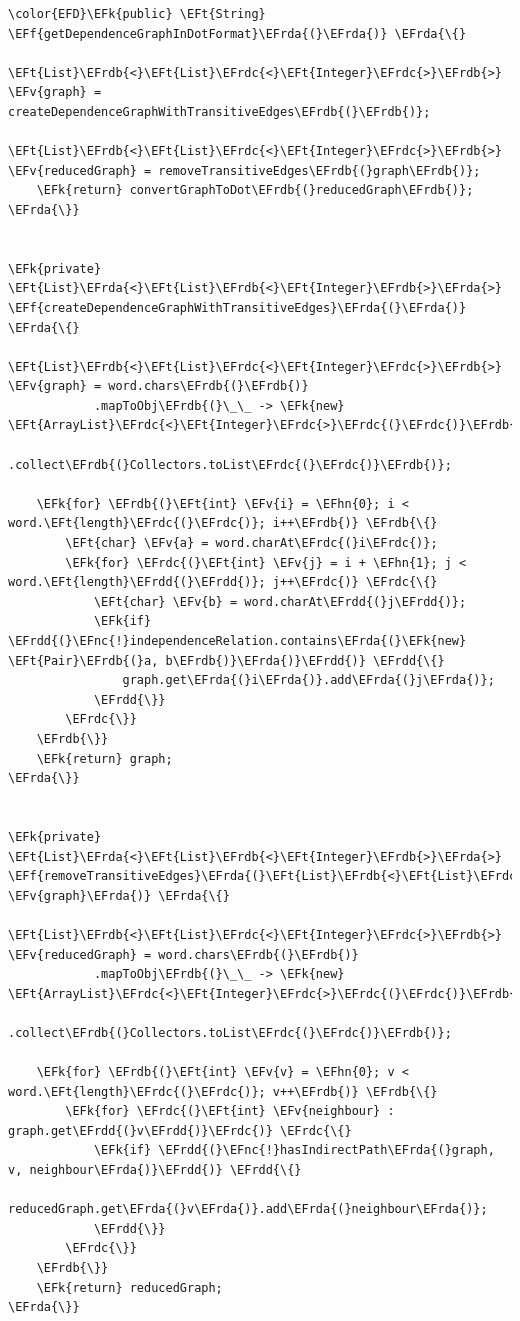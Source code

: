 \documentclass[11pt]{article}
\newcommand{\EFk}[1]{\textcolor{EFk}{#1}} %
\newcommand{\EFf}[1]{\textcolor{EFf}{#1}} %
\newcommand{\EFv}[1]{\textcolor{EFv}{#1}} %
\newcommand{\EFt}[1]{\textcolor{EFt}{#1}} %
\newcommand{\EFnc}[1]{\textcolor{EFnc}{\textbf{#1}}} %
\newcommand{\EFhn}[1]{\textcolor{EFhn}{#1}} %
\newcommand{\EFrda}[1]{#1} %
\newcommand{\EFrdb}[1]{\textcolor{EFrdb}{#1}} %
\newcommand{\EFrdc}[1]{\textcolor{EFrdc}{#1}} %
\newcommand{\EFrdd}[1]{\textcolor{EFrdd}{#1}} %
\begin{document}
\begin{Code}
\begin{Verbatim}
\color{EFD}\EFk{public} \EFt{String} \EFf{getDependenceGraphInDotFormat}\EFrda{(}\EFrda{)} \EFrda{\{}
    \EFt{List}\EFrdb{<}\EFt{List}\EFrdc{<}\EFt{Integer}\EFrdc{>}\EFrdb{>} \EFv{graph} = createDependenceGraphWithTransitiveEdges\EFrdb{(}\EFrdb{)};
    \EFt{List}\EFrdb{<}\EFt{List}\EFrdc{<}\EFt{Integer}\EFrdc{>}\EFrdb{>} \EFv{reducedGraph} = removeTransitiveEdges\EFrdb{(}graph\EFrdb{)};
    \EFk{return} convertGraphToDot\EFrdb{(}reducedGraph\EFrdb{)};
\EFrda{\}}


\EFk{private} \EFt{List}\EFrda{<}\EFt{List}\EFrdb{<}\EFt{Integer}\EFrdb{>}\EFrda{>} \EFf{createDependenceGraphWithTransitiveEdges}\EFrda{(}\EFrda{)} \EFrda{\{}
    \EFt{List}\EFrdb{<}\EFt{List}\EFrdc{<}\EFt{Integer}\EFrdc{>}\EFrdb{>} \EFv{graph} = word.chars\EFrdb{(}\EFrdb{)}
            .mapToObj\EFrdb{(}\_\_ -> \EFk{new} \EFt{ArrayList}\EFrdc{<}\EFt{Integer}\EFrdc{>}\EFrdc{(}\EFrdc{)}\EFrdb{)}
            .collect\EFrdb{(}Collectors.toList\EFrdc{(}\EFrdc{)}\EFrdb{)};

    \EFk{for} \EFrdb{(}\EFt{int} \EFv{i} = \EFhn{0}; i < word.\EFt{length}\EFrdc{(}\EFrdc{)}; i++\EFrdb{)} \EFrdb{\{}
        \EFt{char} \EFv{a} = word.charAt\EFrdc{(}i\EFrdc{)};
        \EFk{for} \EFrdc{(}\EFt{int} \EFv{j} = i + \EFhn{1}; j < word.\EFt{length}\EFrdd{(}\EFrdd{)}; j++\EFrdc{)} \EFrdc{\{}
            \EFt{char} \EFv{b} = word.charAt\EFrdd{(}j\EFrdd{)};
            \EFk{if} \EFrdd{(}\EFnc{!}independenceRelation.contains\EFrda{(}\EFk{new} \EFt{Pair}\EFrdb{(}a, b\EFrdb{)}\EFrda{)}\EFrdd{)} \EFrdd{\{}
                graph.get\EFrda{(}i\EFrda{)}.add\EFrda{(}j\EFrda{)};
            \EFrdd{\}}
        \EFrdc{\}}
    \EFrdb{\}}
    \EFk{return} graph;
\EFrda{\}}


\EFk{private} \EFt{List}\EFrda{<}\EFt{List}\EFrdb{<}\EFt{Integer}\EFrdb{>}\EFrda{>} \EFf{removeTransitiveEdges}\EFrda{(}\EFt{List}\EFrdb{<}\EFt{List}\EFrdc{<}\EFt{Integer}\EFrdc{>}\EFrdb{>} \EFv{graph}\EFrda{)} \EFrda{\{}
    \EFt{List}\EFrdb{<}\EFt{List}\EFrdc{<}\EFt{Integer}\EFrdc{>}\EFrdb{>} \EFv{reducedGraph} = word.chars\EFrdb{(}\EFrdb{)}
            .mapToObj\EFrdb{(}\_\_ -> \EFk{new} \EFt{ArrayList}\EFrdc{<}\EFt{Integer}\EFrdc{>}\EFrdc{(}\EFrdc{)}\EFrdb{)}
            .collect\EFrdb{(}Collectors.toList\EFrdc{(}\EFrdc{)}\EFrdb{)};

    \EFk{for} \EFrdb{(}\EFt{int} \EFv{v} = \EFhn{0}; v < word.\EFt{length}\EFrdc{(}\EFrdc{)}; v++\EFrdb{)} \EFrdb{\{}
        \EFk{for} \EFrdc{(}\EFt{int} \EFv{neighbour} : graph.get\EFrdd{(}v\EFrdd{)}\EFrdc{)} \EFrdc{\{}
            \EFk{if} \EFrdd{(}\EFnc{!}hasIndirectPath\EFrda{(}graph, v, neighbour\EFrda{)}\EFrdd{)} \EFrdd{\{}
                reducedGraph.get\EFrda{(}v\EFrda{)}.add\EFrda{(}neighbour\EFrda{)};
            \EFrdd{\}}
        \EFrdc{\}}
    \EFrdb{\}}
    \EFk{return} reducedGraph;
\EFrda{\}}



\end{Verbatim}
\end{Code}
\end{document}

